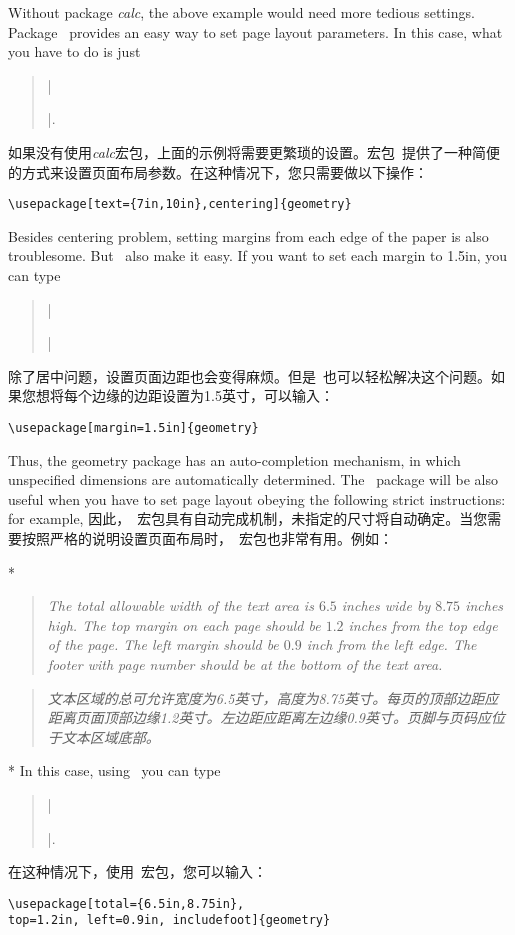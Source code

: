 \begin{paracol}{2}
Without package \textsl{calc}, the above example would need
more tedious settings. Package \Gm\ provides an easy
way to set page layout parameters. In this case, what you have to do
is just
\begin{quote}
|\usepackage[text={7in,10in},centering]{geometry}|. 
\end{quote}
\switchcolumn
如果没有使用\textsl{calc}宏包，上面的示例将需要更繁琐的设置。宏包\Gm\ 提供了一种简便的方式来设置页面布局参数。在这种情况下，您只需要做以下操作：
\begin{verbatim}
\usepackage[text={7in,10in},centering]{geometry}
\end{verbatim}
\switchcolumn
Besides centering problem, setting margins from each edge of the paper is
also troublesome. But \Gm\ also make it easy.
If you want to set each margin to 1.5in, you can type
\begin{quote}
|\usepackage[margin=1.5in]{geometry}| 
\end{quote}
\switchcolumn
除了居中问题，设置页面边距也会变得麻烦。但是\Gm\ 也可以轻松解决这个问题。如果您想将每个边缘的边距设置为1.5英寸，可以输入：
\begin{verbatim}
\usepackage[margin=1.5in]{geometry}
\end{verbatim}
\switchcolumn
Thus, the geometry package has an auto-completion mechanism, in which
unspecified dimensions are automatically determined.
The \Gm\ package will be also useful when you have to set page layout
obeying the following strict instructions: for example,
\switchcolumn
因此，\Gm\ 宏包具有自动完成机制，未指定的尺寸将自动确定。当您需要按照严格的说明设置页面布局时，\Gm\ 宏包也非常有用。例如：

\switchcolumn[0]*
\begin{quote}\slshape
The total allowable width of the text area is $6.5$ inches wide by $8.75$
inches high. The top margin on each page should be $1.2$ inches from
the top edge of the page. The left margin should be $0.9$ inch from 
the left edge. The footer with page number should be at the bottom
of the text area.
\end{quote}
\switchcolumn
\begin{quote}\slshape
文本区域的总可允许宽度为6.5英寸，高度为8.75英寸。每页的顶部边距应距离页面顶部边缘1.2英寸。左边距应距离左边缘0.9英寸。页脚与页码应位于文本区域底部。
\end{quote}

\switchcolumn[0]*
In this case, using \Gm\ you can type
\begin{quote}
|\usepackage[total={6.5in,8.75in},|\\
|            top=1.2in, left=0.9in, includefoot]{geometry}|.
\end{quote}
\switchcolumn
在这种情况下，使用\Gm\ 宏包，您可以输入：
\begin{verbatim}
\usepackage[total={6.5in,8.75in},
top=1.2in, left=0.9in, includefoot]{geometry}
\end{verbatim}


\end{paracol}
